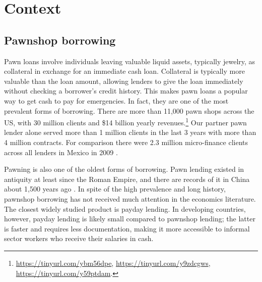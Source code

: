 \documentclass[ecta,nameyear,final]{econsocart}
\begin{document}
\section{Context} \label{context}

\subsection{Pawnshop borrowing}
    
Pawn loans involve individuals leaving valuable liquid assets, typically jewelry, as collateral in exchange for an immediate cash loan. Collateral is typically more valuable than the loan amount, allowing lenders to give the loan immediately without checking a borrower's credit history. This makes pawn loans a popular way to get cash to pay for emergencies. In fact, they are one of the most prevalent forms of borrowing. There are more than 11,000 pawn shops across the US, with 30 million clients and \$14 billion yearly revenues.\footnote{\url{https://tinyurl.com/ybm56dpe}, \url{https://tinyurl.com/y9zdcgws}, \url{https://tinyurl.com/y59ptdam}.} Our partner pawn lender alone served more than 1 million clients in the last 3 years with more than 4 million contracts. For comparison there were 2.3 million micro-finance clients across all lenders in Mexico in 2009 \citep{Pedroza:2010}. 

Pawning is also one of the oldest forms of borrowing. Pawn lending existed in antiquity at least since the Roman Empire, and there are records of it in China about 1,500 years ago \citep{PawnShops}. In spite of the high prevalence and long history, pawnshop borrowing has not received much attention in the economics literature. The closest widely studied product is payday lending. In developing countries, however, payday lending is likely small compared to pawnshop lending; the latter is faster and requires less documentation, making it more accessible to informal sector workers who receive their salaries in cash. %

\end{document}
